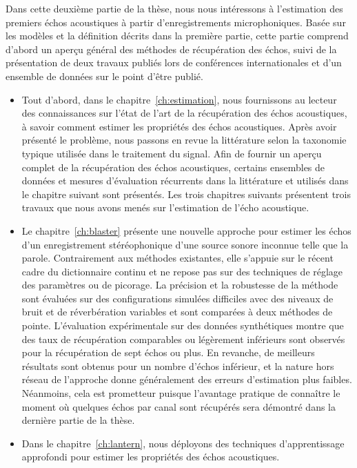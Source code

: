Dans cette deuxième partie de la thèse, nous nous intéressons à l'estimation des premiers échos acoustiques à partir d'enregistrements microphoniques.
Basée sur les modèles et la définition décrits dans la première partie, cette partie comprend d'abord un aperçu général des méthodes de récupération des échos, suivi de la présentation de deux travaux publiés lors de conférences internationales et d'un ensemble de données sur le point d'être publié.
\begin{itemize}
    \item
    Tout d'abord, dans le chapitre~\ref{ch:estimation}, nous fournissons au lecteur des connaissances sur l'état de l'art de la récupération des échos acoustiques, à savoir comment estimer les propriétés des échos acoustiques. Après avoir présenté le problème, nous passons en revue la littérature selon la taxonomie typique utilisée dans le traitement du signal. Afin de fournir un aperçu complet de la récupération des échos acoustiques, certains ensembles de données et mesures d'évaluation récurrents dans la littérature et utilisés dans le chapitre suivant sont présentés.
    Les trois chapitres suivants présentent trois travaux que nous avons menés sur l'estimation de l'écho acoustique.
    \item
    Le chapitre~\ref{ch:blaster} présente une nouvelle approche pour estimer les échos d'un enregistrement stéréophonique d'une source sonore inconnue telle que la parole.  Contrairement aux méthodes existantes, elle s'appuie sur le récent cadre du dictionnaire continu et ne repose pas sur des techniques de réglage des paramètres ou de picorage.
    La précision et la robustesse de la méthode sont évaluées sur des configurations simulées difficiles avec des niveaux de bruit et de réverbération variables et sont comparées à deux méthodes de pointe. L'évaluation expérimentale sur des données synthétiques montre que des taux de récupération comparables ou légèrement inférieurs sont observés pour la récupération de sept échos ou plus. En revanche, de meilleurs résultats sont obtenus pour un nombre d'échos inférieur, et la nature hors réseau de l'approche donne généralement des erreurs d'estimation plus faibles.
    Néanmoins, cela est prometteur puisque l'avantage pratique de connaître le moment où quelques échos par canal sont récupérés sera démontré dans la dernière partie de la thèse.
    \item
    Dans le chapitre~\ref{ch:lantern}, nous déployons des techniques d'apprentissage approfondi pour estimer les propriétés des échos acoustiques.

\end{itemize}
